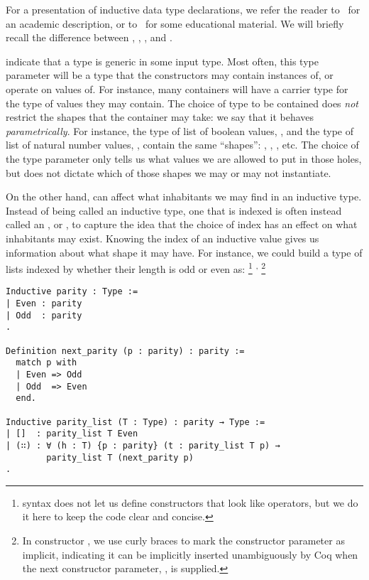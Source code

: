 For a presentation of inductive data type declarations, we refer the reader
to~ for an academic description, or
to~ for some educational material.  We will briefly
recall the difference between , , , and .

 indicate that a type is generic in some input
type.  Most often, this type parameter will be a type that the constructors may
contain instances of, or operate on values of.  For instance, many containers
will have a carrier type for the type of values they may contain.  The choice of
type to be contained does \emph{not} restrict the shapes that the container may
take: we say that it behaves \emph{parametrically}.  For instance, the type of
list of boolean values, , and the type of list of natural
number values, , contain the same ``shapes'':
\coqinline{[]}, , , etc.  The choice of
the type parameter only tells us what values we are allowed to put in those
holes, but does not dictate which of those shapes we may or may not instantiate.

On the other hand,  can affect what inhabitants we may
find in an inductive type.  Instead of being called an inductive type, one that
is indexed is often instead called an , or
, to capture the idea that the choice of index has
an effect on what inhabitants may exist.  Knowing the index of an inductive
value gives us information about what shape it may have.  For instance, we could
build a type of lists indexed by whether their length is odd or even as:%
%
\footnote{\Coq{} syntax does not let us define constructors that look like
operators, but we do it here to keep the code clear and concise.}%
%
\textsuperscript{,}%
%
\footnote{In constructor , we use curly braces  to
mark the constructor parameter as implicit, indicating it can be implicitly
inserted unambiguously by Coq when the next constructor parameter,
, is supplied.}

\begin{verbatim}
Inductive parity : Type :=
| Even : parity
| Odd  : parity
.

Definition next_parity (p : parity) : parity :=
  match p with
  | Even => Odd
  | Odd  => Even
  end.

Inductive parity_list (T : Type) : parity → Type :=
| []  : parity_list T Even
| (∷) : ∀ (h : T) {p : parity} (t : parity_list T p) →
        parity_list T (next_parity p)
.
\end{verbatim}

